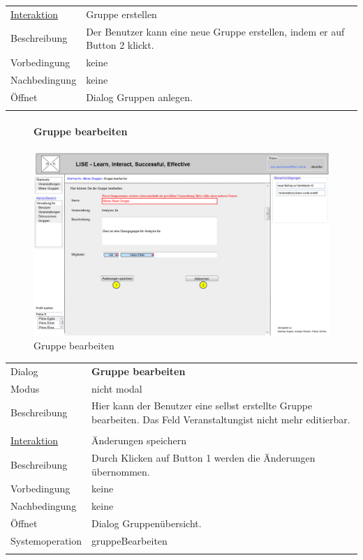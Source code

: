 \documentclass[12pt,a4paper]{article}
\begin{document}
{\begin{tabular}{l p{12cm}}
	\underline{Interaktion} 	 & Gruppe erstellen\\ 
	Beschreibung   	& Der Benutzer kann eine neue Gruppe erstellen, indem er auf Button 2 klickt.\\
	Vorbedingung	& keine \\
	Nachbedingung	& keine \\
	Öffnet			& Dialog \glqq Gruppen anlegen\grqq.\\\\
\end{tabular}

\begin{figure}[H]
	\centering
	\paragraph{Gruppe bearbeiten}
	\includegraphics[width=\textwidth]{Bilder/Mockups/GUI/GruppeBearbeiten.png}
	\caption{Gruppe bearbeiten}
	\label{GuiGruppeBearbeiten}
\end{figure}
\begin{tabular}{l p{12cm}}
	Dialog 	 & \textbf{Gruppe bearbeiten} \\ 
	Modus & nicht modal\\ 
	Beschreibung   	& Hier kann der Benutzer eine selbst erstellte Gruppe bearbeiten. Das Feld \glqq Veranstaltung\grqq ist nicht mehr editierbar. \\\\
	
	\underline{Interaktion} 	 & Änderungen speichern\\ 
	Beschreibung   	& Durch Klicken auf Button 1 werden die Änderungen übernommen.\\
	Vorbedingung	& keine \\
	Nachbedingung	& keine \\
	Öffnet			& Dialog \glqq Gruppenübersicht\grqq.\\
	Systemoperation & gruppeBearbeiten\\\\
\end{tabular}

}
\end{document}
